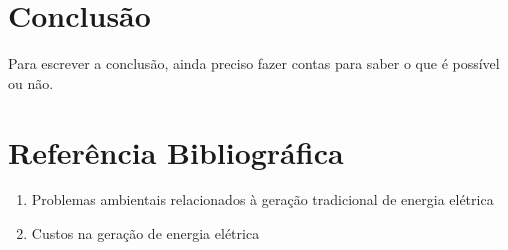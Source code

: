 \documentclass[12pt, a4paper, twoside]{article}
\begin{document}

\section{Conclusão}

Para escrever a conclusão, ainda preciso fazer contas para saber o que é
possível ou não.

\section{Referência Bibliográfica}

\begin{enumerate}
    \item Problemas ambientais relacionados à geração tradicional de energia
    elétrica
    \item Custos na geração de energia elétrica
\end{enumerate}
\end{document}
